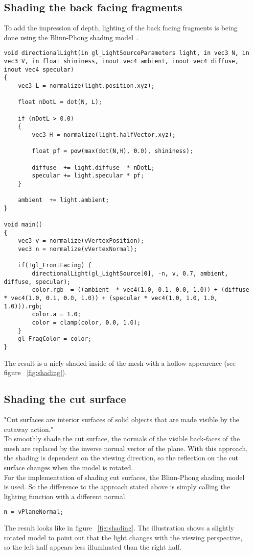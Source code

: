 \subsection{Shading the back facing fragments}
To add the impression of depth, lighting of the back facing fragments is being done using the Blinn-Phong shading model~\cite{book:computerGraphicsHearn}.
\begin{lstlisting}
void directionalLight(in gl_LightSourceParameters light, in vec3 N, in vec3 V, in float shininess, inout vec4 ambient, inout vec4 diffuse, inout vec4 specular)
{
	vec3 L = normalize(light.position.xyz);
	 
	float nDotL = dot(N, L);
	 
	if (nDotL > 0.0)
	{   
		vec3 H = normalize(light.halfVector.xyz);
			 
		float pf = pow(max(dot(N,H), 0.0), shininess);

		diffuse  += light.diffuse  * nDotL;
		specular += light.specular * pf;
	}
	 
	ambient  += light.ambient;
}

void main()
{
	vec3 v = normalize(vVertexPosition);
	vec3 n = normalize(vVertexNormal);
	
	if(!gl_FrontFacing) {
		directionalLight(gl_LightSource[0], -n, v, 0.7, ambient, diffuse, specular);
		color.rgb  = ((ambient  * vec4(1.0, 0.1, 0.0, 1.0)) + (diffuse  * vec4(1.0, 0.1, 0.0, 1.0)) + (specular * vec4(1.0, 1.0, 1.0, 1.0))).rgb;			
		color.a = 1.0;			
		color = clamp(color, 0.0, 1.0);
	}
	gl_FragColor = color;
}
\end{lstlisting}

The result is a nicly shaded inside of the mesh with a hollow appearence (see figure ~\ref{fig:shading}).

\subsection{Shading the cut surface}
\label{chap:cutSurface}
"Cut surfaces are interior surfaces of solid objects that are made visible by the cutaway action."~\cite{jour:adaptiveCutaways}\\
To smoothly shade the cut surface, the normals of the visible back-faces of the mesh are replaced by the inverse normal vector of the plane. With this approach, the shading is dependent on the viewing direction, so the reflection on the cut surface changes when the model is rotated.\\
For the implementation of shading cut surfaces, the Blinn-Phong shading model is used. So the difference to the approach stated above is simply calling the lighting function with a different normal.
\begin{lstlisting}
n = vPlaneNormal;
\end{lstlisting}
The result looks like in figure ~\ref{fig:shading}. The illustration shows a slightly rotated model to point out that the light changes with the viewing perspective, so the left half appears less illuminated than the right half.

